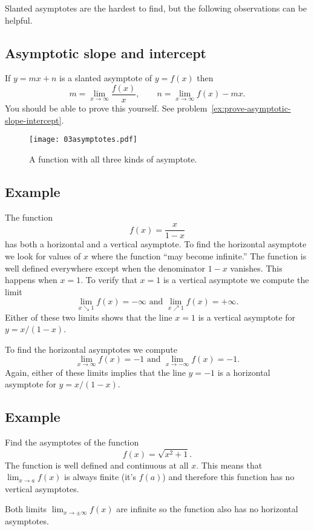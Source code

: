 Slanted asymptotes are the hardest to find, but the following
observations can be helpful.  

\subsection{Asymptotic slope and intercept}
If $y=mx+n$ is a slanted asymptote of $y=f(x)$ then
\begin{equation}
  m = \lim_{x\to\infty} \frac{f(x)}{x}, \qquad
  n = \lim_{x\to\infty} f(x) - mx.
  \label{eq:03asymptotic-slope-intercept}
\end{equation}
You should be able to prove this yourself. See
problem~\ref{ex:prove-asymptotic-slope-intercept}.


\begin{figure}[bt]
  \texttt{[image: 03asymptotes.pdf]}
  \caption{A function with all three kinds of asymptote. }
  \label{fig:03asymptotes}
\end{figure}

\subsection{Example}
The function
\[
f(x) = \dfrac x{1-x}
\]
has both a horizontal and a vertical asymptote.  To find the
horizontal asymptote we look for values of $x$ where the function
``may become infinite.'' The function is well defined everywhere
except when the denominator $1-x$ vanishes.  This happens when $x=1$.
To verify that $x=1$ is a vertical asymptote we compute the limit
\[
\lim_{x\searrow1} f(x) = -\infty \text { and }
\lim_{x\nearrow1} f(x) = +\infty.
\]
Either of these two limits shows that the line $x=1$ is a vertical
asymptote for $y= x/(1-x)$.

To find the horizontal asymptotes we compute
\[
\lim_{x\to\infty} f(x) = -1
\text{ and }
\lim_{x\to-\infty} f(x) = -1.
\]
Again, either of these limits implies that the line $y=-1$ is a
horizontal asymptote for $y=x/(1-x)$.

\subsection{Example}
Find the asymptotes of the function 
\[
f(x) = \sqrt{x^2+1}.
\]
The function is well defined and continuous at all $x$.  This means
that $\lim_{x\to a} f(x)$ is always finite (it's $f(a)$) and therefore
this function has no vertical asymptotes.

Both limits $\lim_{x\to\pm\infty} f(x)$ are infinite so the function
also has no horizontal asymptotes.  

